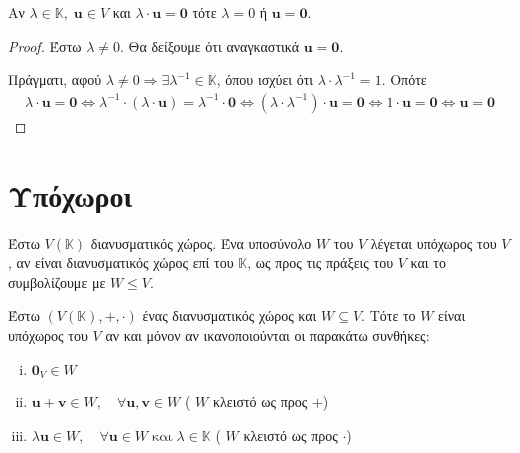 \begin{prop} \label{prop:prod}
\item {}
  Αν $ \lambda \in \mathbb{K}, \; \mathbf{u} \in V $ και $ \lambda \cdot \mathbf{u} =
  \mathbf{0} $ τότε $ \lambda = 0 $ ή $ \mathbf{u} = \mathbf{0} $. 
\end{prop}

\begin{proof}
\item {}
  Έστω $ \lambda \neq 0 $. Θα δείξουμε ότι αναγκαστικά $ \mathbf{u} = \mathbf{0} $. 

  Πράγματι, αφού $ \lambda \neq 0 \Rightarrow \exists \lambda ^{-1} \in \mathbb{K} $, 
  όπου ισχύει ότι $ \lambda \cdot \lambda ^{-1} = 1 $. Οπότε 
  \begin{gather*}
    \lambda \cdot \mathbf{u} = \mathbf{0} \Leftrightarrow 
    \lambda ^{-1}\cdot (\lambda \cdot \mathbf{u}) = \lambda ^{-1} \cdot \mathbf{0}
    \Leftrightarrow 
    (\lambda \cdot \lambda ^{-1}) \cdot \mathbf{u} = \mathbf{0} \Leftrightarrow 
    1 \cdot \mathbf{u} = \mathbf{0} \Leftrightarrow 
    \mathbf{u} = \mathbf{0} 
  \end{gather*} 
\end{proof}



\section{Υπόχωροι}


\begin{dfn}
\item {}
  Έστω $V(\mathbb{K}) $ διανυσματικός χώρος. Ένα υποσύνολο $W$ του $V$ λέγεται 
  \textcolor{Col2}{υπόχωρος} του $ V $, αν είναι διανυσματικός χώρος επί του 
  $ \mathbb{K} $, ως προς τις πράξεις του $V$ και το συμβολίζουμε με $ W \leq V $.
\end{dfn}



\begin{prop}
  \label{prop:subsp}
\item {}
  Έστω $ (V(\mathbb{K}),+,\cdot) $ ένας διανυσματικός χώρος και $ W \subseteq V $.  
  Τότε το $ W $ είναι υπόχωρος του $V$ αν και μόνον αν ικανοποιούνται οι 
  παρακάτω συνθήκες:
  \begin{enumerate}[i)]
    \item $ \mathbf{0}_{V} \in W $
    \item $ \mathbf{u}+ \mathbf{v} \in W, \quad \forall \mathbf{u}, 
      \mathbf{v} \in W $ \quad ( $W$ κλειστό ως προς $ + $)
    \item $ \lambda \mathbf{u} \in W, \quad \forall \mathbf{u} \in W \; 
      \text{και} \; \lambda \in \mathbb{K} $ \quad ( $W$ κλειστό ως προς 
      $ \cdot $)
  \end{enumerate}
\end{prop}

